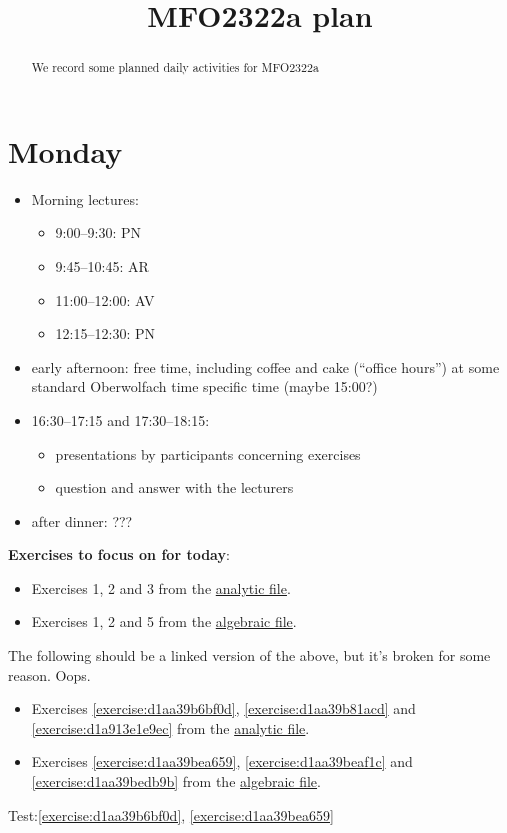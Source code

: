 \documentclass[reqno]{amsart} 
\title{MFO2322a plan}
\begin{document}
\begin{abstract}
  We record some planned daily activities for MFO2322a
\end{abstract}

\section{Monday}
\begin{itemize}
\item Morning lectures:
  \begin{itemize}
  \item 9:00--9:30: PN
  \item 9:45--10:45: AR
  \item 11:00--12:00: AV
  \item 12:15--12:30: PN
  \end{itemize}
\item early afternoon: free time, including coffee and cake (``office hours'') at some standard Oberwolfach time specific time (maybe 15:00?)
\item 16:30--17:15 and 17:30--18:15:
  \begin{itemize}
  \item presentations by participants concerning exercises
  \item question and answer with the lecturers
  \end{itemize}
\item after dinner: ???
\end{itemize}

\textbf{Exercises to focus on for today}:
\begin{itemize}
\item Exercises 1, 2 and 3 from the \href{20230524T094424__exercises-localized-vectors.pdf}{analytic file}.
\item Exercises 1, 2 and 5 from the \href{20230528T213149__microlocal-algebraic-exercises.pdf}{algebraic file}.
\end{itemize}

The following should be a linked version of the above, but it's broken for some reason.  Oops.
\begin{itemize}
\item Exercises \ref{exercise:d1aa39b6bf0d}, \ref{exercise:d1aa39b81acd} and \ref{exercise:d1a913e1e9ec} from the \href{20230524T094424__exercises-localized-vectors.pdf}{analytic file}.
\item Exercises \ref{exercise:d1aa39bea659}, \ref{exercise:d1aa39beaf1c} and \ref{exercise:d1aa39bedb9b} from the \href{20230528T213149__microlocal-algebraic-exercises.pdf}{algebraic file}.
\end{itemize}

Test:\ref{exercise:d1aa39b6bf0d}, \ref{exercise:d1aa39bea659}


{} 
\end{document}
